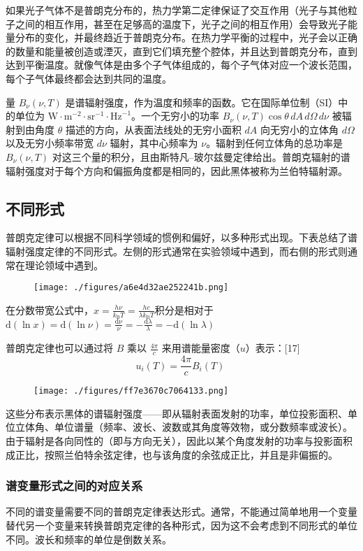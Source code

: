 如果光子气体不是普朗克分布的，热力学第二定律保证了交互作用（光子与其他粒子之间的相互作用，甚至在足够高的温度下，光子之间的相互作用）会导致光子能量分布的变化，并最终趋近于普朗克分布。在热力学平衡的过程中，光子会以正确的数量和能量被创造或湮灭，直到它们填充整个腔体，并且达到普朗克分布，直到达到平衡温度。就像气体是由多个子气体组成的，每个子气体对应一个波长范围，每个子气体最终都会达到共同的温度。

量 \( B_\nu(\nu, T) \) 是谱辐射强度，作为温度和频率的函数。它在国际单位制（SI）中的单位为 \( \text{W} \cdot \text{m}^{-2} \cdot \text{sr}^{-1} \cdot \text{Hz}^{-1} \)。一个无穷小的功率 \( B_\nu(\nu, T) \cos \theta \, dA \, d\Omega \, d\nu \) 被辐射到由角度 \( \theta \) 描述的方向，从表面法线处的无穷小面积 \( dA \) 向无穷小的立体角 \( d\Omega \) 以及无穷小频率带宽 \( d\nu \) 辐射，其中心频率为 \( \nu \)。辐射到任何立体角的总功率是 \( B_\nu(\nu, T) \) 对这三个量的积分，且由斯特凡–玻尔兹曼定律给出。普朗克辐射的谱辐射强度对于每个方向和偏振角度都是相同的，因此黑体被称为兰伯特辐射源。
\subsection{不同形式}
普朗克定律可以根据不同科学领域的惯例和偏好，以多种形式出现。下表总结了谱辐射强度定律的不同形式。左侧的形式通常在实验领域中遇到，而右侧的形式则通常在理论领域中遇到。
\begin{figure}[ht]
\centering
\texttt{[image: ./figures/a6e4d32ae252241b.png]}
\caption{} \label{fig_HTFS_3}
\end{figure}
在分数带宽公式中，\(x = \frac{h \nu}{k_{\mathrm{B}} T} = \frac{hc}{\lambda k_{\mathrm{B}} T}\)积分是相对于\(\mathrm{d} (\ln x) = \mathrm{d} (\ln \nu) = \frac{\mathrm{d} \nu}{\nu} = -\frac{\mathrm{d} \lambda}{\lambda} = -\mathrm{d} (\ln \lambda)\)

普朗克定律也可以通过将 \( B \) 乘以 \( \frac{4 \pi}{c} \) 来用谱能量密度（\( u \)）表示：[17]
\[
u_{i}(T) = \frac{4 \pi}{c} B_{i}(T)~
\]
\begin{figure}[ht]
\centering
\texttt{[image: ./figures/ff7e3670c7064133.png]}
\caption{} \label{fig_HTFS_4}
\end{figure}
这些分布表示黑体的谱辐射强度——即从辐射表面发射的功率，单位投影面积、单位立体角、单位谱量（频率、波长、波数或其角度等效物，或分数频率或波长）。由于辐射是各向同性的（即与方向无关），因此以某个角度发射的功率与投影面积成正比，按照兰伯特余弦定律，也与该角度的余弦成正比，并且是非偏振的。
\subsubsection{谱变量形式之间的对应关系}
不同的谱变量需要不同的普朗克定律表达形式。通常，不能通过简单地用一个变量替代另一个变量来转换普朗克定律的各种形式，因为这不会考虑到不同形式的单位不同。波长和频率的单位是倒数关系。

